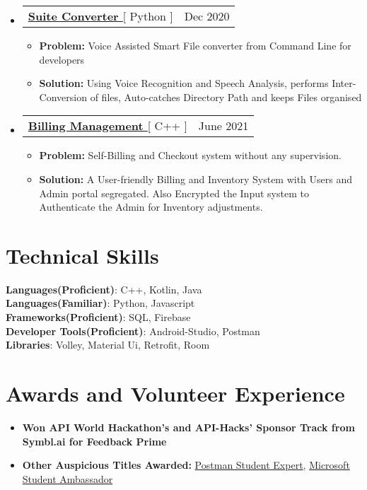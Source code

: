 \documentclass[letterpaper,11pt]{article}
\makeatletter
\newcommand{\resumeItem}[1]{
  \item\small{
    {#1 \vspace{-2pt}}
  }
}
\newcommand{\resumeProjectHeading}[2]{
    \item
    \begin{tabular*}{0.97\textwidth}{l@{\extracolsep{\fill}}r}
      \small#1 & #2 \\
    \end{tabular*}\vspace{-7pt}
}
\newcommand{\resumeSubHeadingListStart}{\begin{itemize}[leftmargin=0.15in, label={}]}
\newcommand{\resumeSubHeadingListEnd}{\end{itemize}}
\newcommand{\resumeItemListStart}{\begin{itemize}}
\newcommand{\resumeItemListEnd}{\end{itemize}\vspace{-5pt}}
\makeatother
\begin{document}
\resumeSubHeadingListStart
      \resumeProjectHeading
          {\textbf{\href{https://github.com/aniketk13/Suite-Converter}{\color{blue}Suite Converter }}{[ Python ]}}{Dec 2020}
          \resumeItemListStart
           \resumeItem{\textbf{Problem:} Voice Assisted Smart File converter from Command Line for developers}
           \resumeItem{\textbf{Solution:} Using Voice Recognition and Speech Analysis, performs Inter-Conversion of files, Auto-catches Directory Path and keeps Files organised}
          \resumeItemListEnd
    \resumeSubHeadingListEnd
\resumeSubHeadingListStart
      \resumeProjectHeading
          {\textbf{\href{https://github.com/aniketk13/Billing_Management}{\color{blue}Billing Management }}{[ C++ ]}}{June 2021}
          \resumeItemListStart
          \resumeItem{\textbf{Problem:} Self-Billing and Checkout system without any supervision.}
          \resumeItem{\textbf{Solution:} A User-friendly Billing and Inventory System with Users and Admin portal segregated. Also Encrypted the Input system to Authenticate the Admin for Inventory adjustments.}
          \resumeItemListEnd
    \resumeSubHeadingListEnd


%
\section{Technical Skills}
 \begin{itemize}[leftmargin=0.15in, label={}]
    \small{\item{
     \textbf{Languages(Proficient)}{: C++, Kotlin, Java} \\
      \textbf{Languages(Familiar)}{: Python, Javascript } \\
     \textbf{Frameworks(Proficient)}{: SQL, Firebase  } \\
     \textbf{Developer Tools(Proficient)}{: Android-Studio, Postman } \\
     \textbf{Libraries}{: Volley, Material Ui, Retrofit, Room  }
    }}
 \end{itemize}

\section{Awards and Volunteer Experience }
 \begin{itemize}[leftmargin=0.15in, label={}]
    \small{\item{
        \resumeItemListStart
                \resumeItem{\textbf{{Won API World Hackathon's and API-Hacks' Sponsor Track from Symbl.ai for Feedback Prime} }}
                \resumeItem{\textbf{Other Auspicious Titles Awarded: }\href{https://api.badgr.io/public/assertions/smxpDApNQkawRdyLq88rTA}{ \color{blue}Postman Student Expert}, \href{https://studentambassadors.microsoft.com/en-US/profile/124303}{\color{blue}Microsoft Student Ambassador}}
      \resumeItemListEnd
    }}
 \end{itemize}
 
\end{document}
